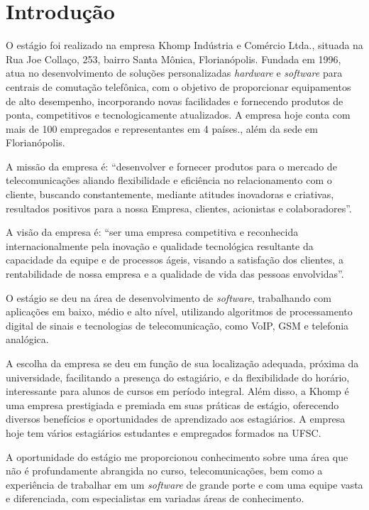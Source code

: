 \documentclass[12pt]{article}
\begin{document}
\begin{resumo}
\end{resumo}

\section{Introdução}

O estágio foi realizado na empresa Khomp Indústria e Comércio Ltda., situada na
Rua Joe Collaço, 253, bairro Santa Mônica, Florianópolis. Fundada em 1996,
atua no desenvolvimento de soluções personalizadas \textit{hardware} e
\textit{software} para centrais de comutação telefônica, com o objetivo de
proporcionar equipamentos de alto desempenho, incorporando novas facilidades e
fornecendo produtos de ponta, competitivos e tecnologicamente atualizados. A
empresa hoje conta com mais de 100 empregados e representantes em 4 países.,
além da sede em Florianópolis.

A missão da empresa é: ``desenvolver e fornecer produtos para o mercado de
telecomunicações aliando flexibilidade e eficiência no relacionamento com o
cliente, buscando constantemente, mediante atitudes inovadoras e criativas,
resultados positivos para a nossa Empresa, clientes, acionistas e
colaboradores''.

A visão da empresa é: ``ser uma empresa competitiva e reconhecida
internacionalmente pela inovação e qualidade tecnológica resultante da
capacidade da equipe e de processos ágeis, visando a satisfação dos clientes, a
rentabilidade de nossa empresa e a qualidade de vida das pessoas envolvidas''.

O estágio se deu na área de desenvolvimento de \textit{software}, trabalhando
com aplicações em baixo, médio e alto nível, utilizando algoritmos de
processamento digital de sinais e tecnologias de telecomunicação, como VoIP,
GSM e telefonia analógica.

A escolha da empresa se deu em função de sua localização adequada, próxima da
universidade, facilitando a presença do estagiário, e da flexibilidade do
horário, interessante para alunos de cursos em período integral. Além disso, a
Khomp é uma empresa prestigiada e premiada em suas práticas de estágio,
oferecendo diversos benefícios e oportunidades de aprendizado aos estagiários.
A empresa hoje tem vários estagiários estudantes e empregados formados na UFSC.

A oportunidade do estágio me proporcionou conhecimento sobre uma área que não é
profundamente abrangida no curso, telecomunicações, bem como a experiência de
trabalhar em um \textit{software} de grande porte e com uma equipe vasta e
diferenciada, com especialistas em variadas áreas de conhecimento.
\end{document}
